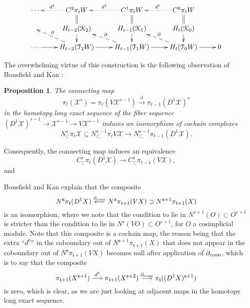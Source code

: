 \documentclass[11pt]{amsart}
\theoremstyle{plain}
\newtheorem{prop}[thm]{Proposition}
\theoremstyle{definition}
\renewcommand{\to}{\longrightarrow}
\newcommand{\from}{\longleftarrow}
\newcommand{\frakt}{\mathfrak{t}}
\newcommand{\fraks}{\mathfrak{s}}
\newcommand{\calT}{\mathcal{T}}
\newcommand{\calK}{\mathcal{K}}
\newcommand{\calX}{\mathcal{X}}
\theoremstyle{plain}
\begin{document}
\begin{BK spec seq}
\[\xymatrix@R=4mm{
\cdots&
C^2\pi_tW  \ar@{..>}[l]_-{d^1}&
C^1\pi_tW  \ar@{..>}[l]_-{d^1}&
C^0\pi_tW  \ar@{..>}[l]_-{d^1}
\\
&
H_{t-2}(\calK_2)\ar[d]\ar@{=}[u]
&
H_{t-1}(\calK_1)\ar[d]\ar@{=}[u]
&
H_{t}(\calK_0)\ar[d]\ar@{=}[u]
\\
\cdots\ar[r]&
H_{t-2}(\calT_2W)\ar[r]\ar@{-->}[ul]_-{\partial}
&
H_{t-1}(\calT_1W)\ar[r]\ar@{-->}[ul]_-{\partial}
&
H_t(\calT_0W)\ar[r]\ar@{-->}[ul]_-{\partial}
&0
}\]

The overwhelming virtue of this construction is the following observation of Bousfield and Kan \cite[Proposition 5.2]{BK_pairings_products.pdf}:
\begin{prop}\label{BK D1 is awesome}
The connecting map
\[\pi_t(\calX^{s})=\pi_t(V\calX^{s-1})\overset{\partial }{\to}\pi_{t-1}(D^1\calX)^s\]
in the homotopy long exact sequence of the fiber sequence $(D^1\calX)^{s-1}\to \calX^{s-1}\to V\calX^{s-1}$ induces an isomorphism of cochain complexes
\[N^s_\subset \pi_t \calX\subseteq N^{s-1}_\subset \pi_t V\calX \to  N^{s-1}_\subset \pi_{t-1} (D^1\calX).\]
\end{prop}
Consequently, the connecting map induces an equivalence
\[C^s_\subset \pi_t (D^1\calX)\to  C^s_\subset \pi_{t-1} (V\calX),\]
and 


Bousfield and Kan explain that the composite
\[N^\fraks\pi_\frakt(D^1X)\overset{\partial_\textup{conn}}{\from}N^\fraks\pi_{\frakt+1}(VX)\supset N^{\fraks+1}\pi_{\frakt+1}(X)\]
is an isomorphism, where we note that the condition to lie in $N^{s+1}(O)\subset O^{s+1}$ is stricter than the condition to lie in $N^s(VO)\subset O^{s+1}$, for $O$ a cosimplicial module. Note that this composite is a cochain map, the reason being that the extra ``$d^0$'' in the coboundary out of $N^{\fraks+1}\pi_{\frakt+1}(X)$ that does not appear in the coboundary out of $N^{\fraks}\pi_{\frakt+1}(VX)$ becomes null after application of $\partial_\textup{conn}$, which is to say that the composite
\[\pi_{\frakt+1}(X^{\fraks+1})\overset{d^0}{\to}\pi_{\frakt+1}(X^{\fraks+2})\overset{\partial_\textup{conn}}{\to}\pi_\frakt((D^1X)^{\fraks+1})\]
is zero, which is clear, as we are just looking at adjacent maps in the homotopy long exact sequence.

\begin{connectivity}

\end{connectivity}
\end{BK spec seq}
\end{document}
